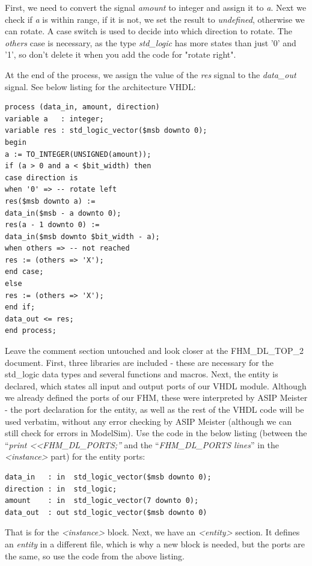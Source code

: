 First, we need to convert the signal \emph{amount} to integer and assign
it to \emph{a}. Next we check if \emph{a} is within range, if it is not,
we set the result to \emph{undefined}, otherwise we can rotate. A case
switch is used to decide into which direction to rotate. The
\emph{others} case is necessary, as the type \emph{std\_logic} has more
states than just '0' and '1', so don't delete it when you add the code
for "rotate right".

At the end of the process, we assign the value of the \emph{res} signal
to the \emph{data\_out} signal. See below listing for the architecture
VHDL:
\begin{lstlisting}
process (data_in, amount, direction)
variable a   : integer;
variable res : std_logic_vector($msb downto 0);
begin
a := TO_INTEGER(UNSIGNED(amount));
if (a > 0 and a < $bit_width) then
case direction is
when '0' => -- rotate left
res($msb downto a) :=
data_in($msb - a downto 0);
res(a - 1 downto 0) :=
data_in($msb downto $bit_width - a);
when others => -- not reached
res := (others => 'X');
end case;
else
res := (others => 'X');
end if;
data_out <= res;
end process;
\end{lstlisting}
Leave the comment section untouched and look closer at the
FHM\_DL\_TOP\_2 document. First, three libraries are included - these
are necessary for the std\_logic data types and several functions and
macros. Next, the entity is declared, which states all input and output
ports of our VHDL module. Although we already defined the ports of our
FHM, these were interpreted by ASIP Meister - the port declaration for
the entity, as well as the rest of the VHDL code will be used verbatim,
without any error checking by ASIP Meister (although we can still check
for errors in ModelSim). Use the code in the below listing (between the
``\emph{print \textless\textless FHM\_DL\_PORTS;''} and the
``\emph{FHM\_DL\_PORTS lines}'' in the
\emph{\textless instance\textgreater{}} part) for the entity ports:
\begin{lstlisting}
data_in   : in  std_logic_vector($msb downto 0);
direction : in  std_logic;
amount    : in  std_logic_vector(7 downto 0);
data_out  : out std_logic_vector($msb downto 0)
\end{lstlisting}
That is for the \emph{\textless instance\textgreater{}} block. Next, we
have an \emph{\textless entity\textgreater{}} section. It defines an
\emph{entity} in a different file, which is why a new block is needed,
but the ports are the same, so use the code from the above listing.

